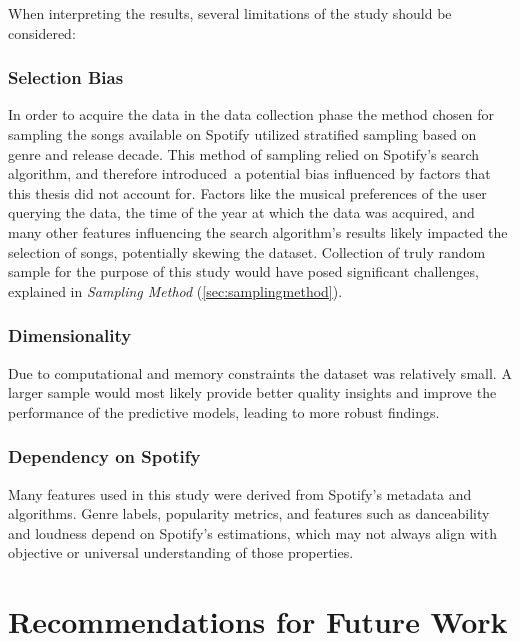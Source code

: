 When interpreting the results, several limitations of the  study should be
considered:

\subsubsection*{Selection Bias}

In order to acquire the data in the data collection phase the method chosen for
sampling the songs available on Spotify utilized  stratified sampling based on
genre and release decade. This method of sampling relied on Spotify's search
algorithm, and therefore introduced~a potential bias influenced by factors that
this thesis did not account for. Factors like the musical preferences of the
user querying the data, the time of the year at which the data was acquired,
and many other features influencing the search algorithm's results likely
impacted the selection of songs, potentially skewing the dataset. Collection of
truly random sample for the purpose of this study would have posed significant
challenges, explained in \textit{Sampling Method} (\ref{sec:samplingmethod}).


\subsubsection*{Dimensionality}

Due to computational and memory constraints the dataset was relatively small.
A larger sample would most likely provide better quality insights and improve
the performance of the predictive models, leading to more robust findings. 


\subsubsection*{Dependency on Spotify}
Many features used in this study were derived from Spotify's metadata and
algorithms. Genre labels, popularity metrics, and features such as danceability
and loudness depend on Spotify's estimations, which may not always align with
objective or universal understanding of those properties.



\section{Recommendations for Future Work}
\label{sec:recommendationsforfuturework}



